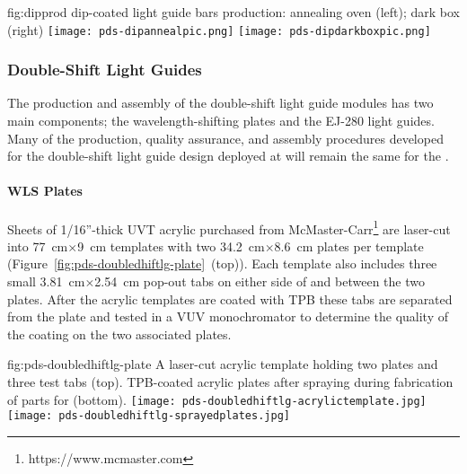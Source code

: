 \begin{dunefigure}{fig:dipprod}
{ dip-coated light guide bars production: annealing oven (left); dark box (right)}
  \texttt{[image: pds-dipannealpic.png]}
  \texttt{[image: pds-dipdarkboxpic.png]}
\end{dunefigure}




\subsubsection{Double-Shift Light Guides}
\label{ssec:fdsp-pd-pc-prod-bar2}

The production and assembly of the double-shift light guide modules has two main components; the wavelength-shifting plates and the EJ-280 light guides. Many of the production, quality assurance, and assembly procedures developed for the double-shift light guide design deployed at  will remain the same for the  .
													
\paragraph*{WLS Plates}

Sheets of 1/16''-thick UVT acrylic purchased from McMaster-Carr\footnote{https://www.mcmaster.com} are laser-cut into \SI{77}{cm}$\times$\SI{9}{cm} templates with two \SI{34.2}{cm}$\times$\SI{8.6}{cm} plates per template (Figure~\ref{fig:pds-doubledhiftlg-plate}~(top)). Each template also includes three small \SI{3.81}{cm}$\times$\SI{2.54}{cm} pop-out tabs on either side of and between the two plates. After the acrylic templates are coated with TPB these tabs are separated from the plate and tested in a VUV monochromator to determine the quality of the coating on the two associated plates.

\begin{dunefigure}
{fig:pds-doubledhiftlg-plate}
{A laser-cut acrylic template holding two plates and three test tabs (top). TPB-coated acrylic plates after spraying during fabrication of parts for  (bottom).}
    \texttt{[image: pds-doubledhiftlg-acrylictemplate.jpg]}\\
    \vspace{0.3cm}
    \texttt{[image: pds-doubledhiftlg-sprayedplates.jpg]}
\end{dunefigure}

